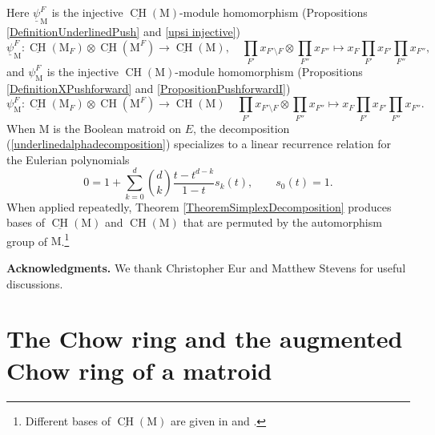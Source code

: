 \documentclass[11pt,reqno]{amsart}
\theoremstyle{definition}
\theoremstyle{remark}
\renewcommand{\(}{\left(}
\renewcommand{\)}{\right)}
\newcommand{\<}{\left<}
\renewcommand{\>}{\right>}
\newcommand{\CH}{\operatorname{CH}}
\begin{document}
Here $\underline{\psi}^F_\mathrm{M}$   is
the injective $\underline{\CH}(\mathrm{M})$-module homomorphism (Propositions \ref{DefinitionUnderlinedPush} and \ref{upsi injective})
\[
\underline{\psi}^F_\mathrm{M}: \underline{\CH}(\mathrm{M}_F) \otimes \underline{\CH}(\mathrm{M}^F)  \longrightarrow \underline{\CH}(\mathrm{M}),
\quad \prod_{F'} x_{F'\setminus F} \otimes \prod_{F''} x_{F''} \longmapsto x_F \prod_{F'} x_{F'} \prod_{F''} x_{F''},
\]
and  $\psi^F_\mathrm{M}$ is the injective $\CH(\mathrm{M})$-module homomorphism (Propositions \ref{DefinitionXPushforward} and \ref{PropositionPushforwardI})
\[
\psi^F_\mathrm{M}: \underline{\CH}(\mathrm{M}_F) \otimes \CH(\mathrm{M}^F)  \longrightarrow \CH(\mathrm{M})
\quad \prod_{F'} x_{F'\setminus F} \otimes \prod_{F''} x_{F''} \longmapsto x_F \prod_{F'} x_{F'} \prod_{F''} x_{F''}.
\]
When $\mathrm{M}$ is the Boolean matroid on $E$, the decomposition (\ref{underlinedalphadecomposition}) specializes to a linear recurrence relation for the Eulerian polynomials
\[
0=1+\sum_{k=0}^d {d \choose k} \frac{t-t^{d-k}}{1-t} s_{k}(t), \qquad s_0(t)=1.
\]
When applied repeatedly, Theorem \ref{TheoremSimplexDecomposition} produces bases of $\underline{\CH}(\mathrm{M})$ and $\CH(\mathrm{M})$ that are permuted by the automorphism group of $\mathrm{M}$.\footnote{Different bases of $\underline{\CH}(\mathrm{M})$ are given in \cite[Corollary 1]{FY} and \cite[Corollary 3.3.3]{BES}.}

\noindent
{\bf Acknowledgments.}
We thank Christopher Eur and Matthew Stevens for useful discussions.

\section{The Chow ring and the augmented Chow ring of a matroid}\label{Section2}
\end{document}

